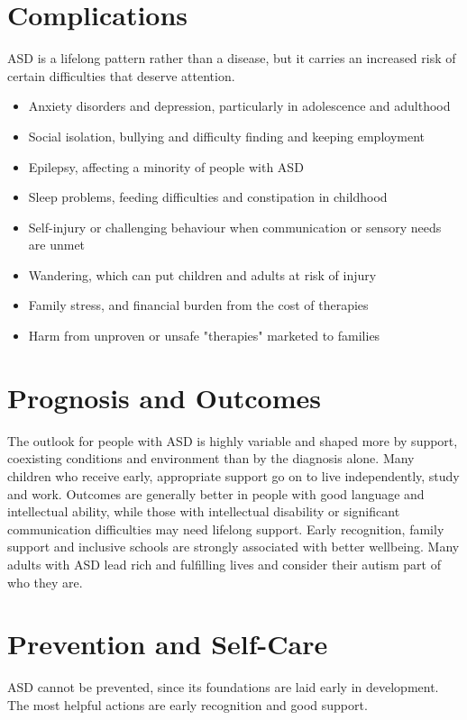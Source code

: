 \section*{Complications}
ASD is a lifelong pattern rather than a disease, but it carries an increased risk of certain difficulties that deserve attention.

\begin{itemize}
    \item Anxiety disorders and depression, particularly in adolescence and adulthood
    \item Social isolation, bullying and difficulty finding and keeping employment
    \item Epilepsy, affecting a minority of people with ASD
    \item Sleep problems, feeding difficulties and constipation in childhood
    \item Self-injury or challenging behaviour when communication or sensory needs are unmet
    \item Wandering, which can put children and adults at risk of injury
    \item Family stress, and financial burden from the cost of therapies
    \item Harm from unproven or unsafe "therapies" marketed to families
\end{itemize}

\section*{Prognosis and Outcomes}
The outlook for people with ASD is highly variable and shaped more by support, coexisting conditions and environment than by the diagnosis alone. Many children who receive early, appropriate support go on to live independently, study and work. Outcomes are generally better in people with good language and intellectual ability, while those with intellectual disability or significant communication difficulties may need lifelong support. Early recognition, family support and inclusive schools are strongly associated with better wellbeing. Many adults with ASD lead rich and fulfilling lives and consider their autism part of who they are.

\section*{Prevention and Self-Care}
ASD cannot be prevented, since its foundations are laid early in development. The most helpful actions are early recognition and good support.

